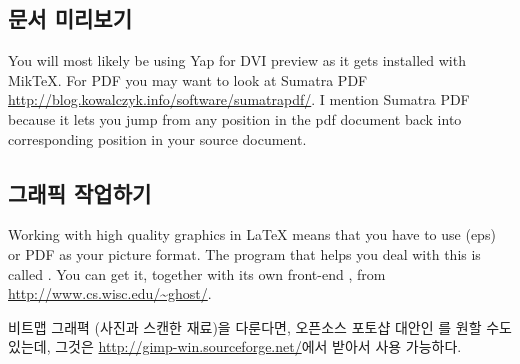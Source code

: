 \subsection{문서 미리보기}
You will most likely be using Yap for DVI preview as it gets installed with
MikTeX. For PDF you may want to look at Sumatra
PDF \url{http://blog.kowalczyk.info/software/sumatrapdf/}. I mention Sumatra PDF
because it lets you jump from any position in the pdf document back into
corresponding position in your source document.

\subsection{그래픽 작업하기}
Working with high quality graphics in \LaTeX{} means that you have to use
\EPSi{} (eps) or PDF as your picture format. The program that helps you
deal with this is called . You can get it, together with its
own front-end , from \url{http://www.cs.wisc.edu/~ghost/}.

비트맵 그래펵 (사진과 스캔한 재료)을 다룬다면, 
오픈소스 포토샵 대안인 를 원할 수도 있는데, 
그것은 \url{http://gimp-win.sourceforge.net/}에서 받아서 사용 가능하다.

